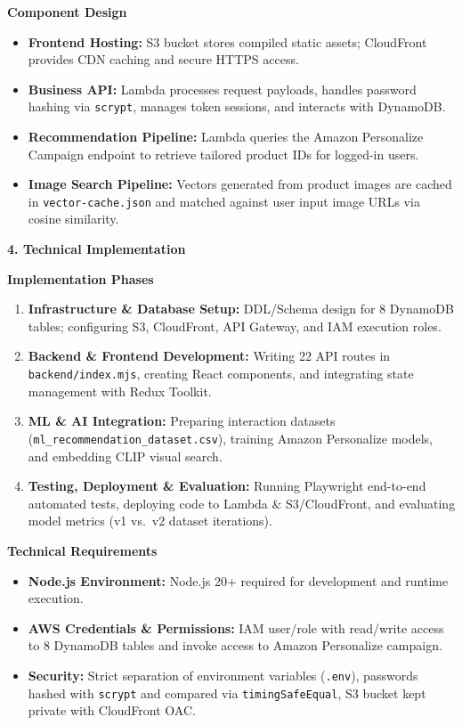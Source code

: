 \vspace{0.5em}\noindent\textbf{Component Design}\par

\begin{itemize}
\tightlist
\item
  \textbf{Frontend Hosting:} S3 bucket stores compiled static assets;
  CloudFront provides CDN caching and secure HTTPS access.
\item
  \textbf{Business API:} Lambda processes request payloads, handles
  password hashing via \texttt{scrypt}, manages token sessions, and
  interacts with DynamoDB.
\item
  \textbf{Recommendation Pipeline:} Lambda queries the Amazon
  Personalize Campaign endpoint to retrieve tailored product IDs for
  logged-in users.
\item
  \textbf{Image Search Pipeline:} Vectors generated from product images
  are cached in \texttt{vector-cache.json} and matched against user
  input image URLs via cosine similarity.
\end{itemize}

\vspace{0.5em}\noindent\textbf{4. Technical
Implementation}\par

\textbf{Implementation Phases}

\begin{enumerate}
\def\labelenumi{\arabic{enumi}.}
\tightlist
\item
  \textbf{Infrastructure \& Database Setup:} DDL/Schema design for 8
  DynamoDB tables; configuring S3, CloudFront, API Gateway, and IAM
  execution roles.
\item
  \textbf{Backend \& Frontend Development:} Writing 22 API routes in
  \texttt{backend/index.mjs}, creating React components, and integrating
  state management with Redux Toolkit.
\item
  \textbf{ML \& AI Integration:} Preparing interaction datasets
  (\texttt{ml\_recommendation\_dataset.csv}), training Amazon
  Personalize models, and embedding CLIP visual search.
\item
  \textbf{Testing, Deployment \& Evaluation:} Running Playwright
  end-to-end automated tests, deploying code to Lambda \& S3/CloudFront,
  and evaluating model metrics (v1 vs.~v2 dataset iterations).
\end{enumerate}

\textbf{Technical Requirements}

\begin{itemize}
\tightlist
\item
  \textbf{Node.js Environment:} Node.js 20+ required for development and
  runtime execution.
\item
  \textbf{AWS Credentials \& Permissions:} IAM user/role with read/write
  access to 8 DynamoDB tables and invoke access to Amazon Personalize
  campaign.
\item
  \textbf{Security:} Strict separation of environment variables
  (\texttt{.env}), passwords hashed with \texttt{scrypt} and compared
  via \texttt{timingSafeEqual}, S3 bucket kept private with CloudFront
  OAC.
\end{itemize}

